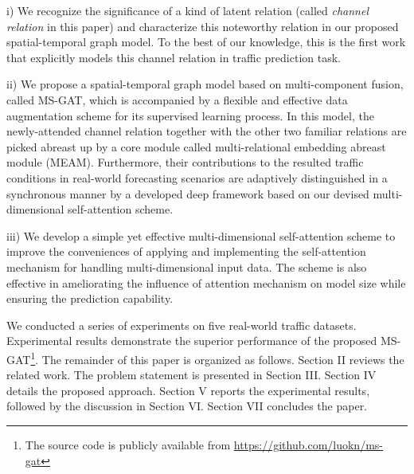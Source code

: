 i) We recognize the significance of a kind of latent relation (called \textit{channel relation} in this paper) and characterize this noteworthy relation in our proposed spatial-temporal graph model. To the best of our knowledge, this is the first work that explicitly models this channel relation in traffic prediction task.

ii) We propose a spatial-temporal graph model based on multi-component fusion, called MS-GAT, which is accompanied by a flexible and effective data augmentation scheme for its supervised learning process. In this model, the newly-attended channel relation together with the other two familiar relations are picked abreast up by a core module called multi-relational embedding abreast module (MEAM). Furthermore, their contributions to the resulted traffic conditions in real-world forecasting scenarios are adaptively distinguished in a synchronous manner by a developed deep framework based on our devised multi-dimensional self-attention scheme.

iii) We develop a simple yet effective multi-dimensional self-attention scheme to improve the conveniences of applying and implementing the self-attention mechanism for handling multi-dimensional input data. The scheme is also effective in ameliorating the influence of attention mechanism on model size while ensuring the prediction capability.

We conducted a series of experiments on five real-world traffic datasets. Experimental results demonstrate the superior performance of the proposed MS-GAT\footnote{The source code is publicly available from \url{https://github.com/luokn/ms-gat}}.
The remainder of this paper is organized as follows. Section II reviews the related work. The problem statement is presented in Section III. Section IV details the proposed approach. Section V reports the experimental results, followed by the discussion in Section VI. Section VII concludes the paper.
